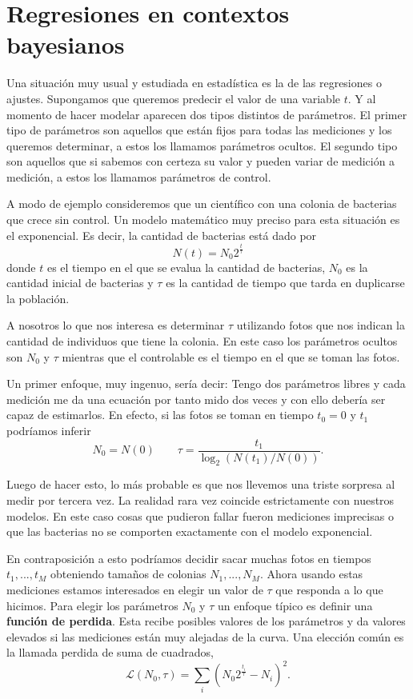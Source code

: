 \chapter{Regresiones en contextos bayesianos}

Una situaci\'on muy usual y estudiada en estad\'istica es la de las regresiones o ajustes. Supongamos que queremos predecir el valor de una variable $t$. Y al momento de hacer modelar aparecen dos tipos distintos de par\'ametros. El primer tipo de par\'ametros son aquellos que est\'an fijos para todas las mediciones y los queremos determinar, a estos los llamamos par\'ametros ocultos. El segundo tipo son aquellos que si sabemos con certeza su valor y pueden variar de medici\'on a medici\'on, a estos los llamamos par\'ametros de control.

A modo de ejemplo consideremos que un cient\'ifico con una colonia de bacterias que crece sin control. Un modelo matem\'atico muy preciso para esta situaci\'on es el exponencial. Es decir, la cantidad de bacterias est\'a dado por 
\begin{equation}
    N(t) = N_0 2^\frac{t}{\tau}
\end{equation}
donde $t$ es el tiempo en el que se evalua la cantidad de bacterias, $N_0$ es la cantidad inicial de bacterias y $\tau$ es la cantidad de tiempo que tarda en duplicarse la poblaci\'on.

A nosotros lo que nos interesa es determinar $\tau$ utilizando fotos que nos indican la cantidad de individuos que tiene la colonia. En este caso los par\'ametros ocultos son $N_0$ y $\tau$ mientras que el controlable es el tiempo en el que se toman las fotos. 

Un primer enfoque, muy ingenuo, ser\'ia decir: Tengo dos par\'ametros libres y cada medici\'on me da una ecuaci\'on por tanto mido dos veces y con ello deber\'ia ser capaz de estimarlos. En efecto, si las fotos se toman en tiempo $t_0=0$ y $t_1$ podr\'iamos inferir
$$
    N_0 = N(0)
    \qquad
    \tau = \frac{t_1}{\log_2(N(t_1)/N(0))}.
$$

Luego de hacer esto, lo m\'as probable es que nos llevemos una triste sorpresa al medir por tercera vez. La realidad rara vez coincide estrictamente con nuestros modelos. En este caso cosas que pudieron fallar fueron mediciones imprecisas o que las bacterias no se comporten exactamente con el modelo exponencial.

En contraposici\'on a esto podr\'iamos decidir sacar muchas fotos en tiempos $t_1,...,t_M$ obteniendo tamaños de colonias $N_1,...,N_M$. Ahora usando estas mediciones estamos interesados en elegir un valor de $\tau$ que responda a lo que hicimos. Para elegir los par\'ametros $N_0$ y $\tau$ un enfoque t\'ipico es definir una {\bf funci\'on de perdida}. Esta recibe posibles valores de los par\'ametros y da valores elevados si las mediciones est\'an muy alejadas de la curva. Una elecci\'on com\'un es la llamada perdida de suma de cuadrados,
$$
    \mathcal{L}(N_0,\tau) = \sum_i \left( N_0 2^\frac{t_i}{\tau} - N_i      \right)^2.
$$

